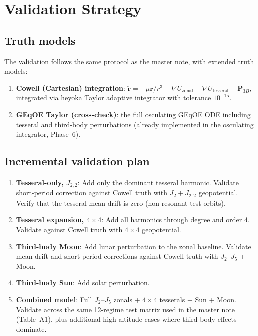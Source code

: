 \documentclass[11pt]{article}
\begin{document}
\section{Validation Strategy}
\label{sec:validation}

\subsection{Truth models}

The validation follows the same protocol as the master note, with extended
truth models:

\begin{enumerate}
\item \textbf{Cowell (Cartesian) integration}: $\ddot{\bm r} =
-\mu\bm r/r^3 - \nabla U_{\text{zonal}} - \nabla U_{\text{tesseral}}
+ \bm P_{3B}$, integrated via heyoka Taylor adaptive integrator with
tolerance $10^{-15}$.

\item \textbf{GEqOE Taylor (cross-check)}: the full osculating GEqOE ODE
including tesseral and third-body perturbations (already implemented in the
osculating integrator, Phase~6).
\end{enumerate}

\subsection{Incremental validation plan}

\begin{enumerate}
\item \textbf{Tesseral-only, $J_{2,2}$}: Add only the dominant tesseral
harmonic. Validate short-period correction against Cowell truth with
$J_2 + J_{2,2}$ geopotential. Verify that the tesseral mean drift is
zero (non-resonant test orbits).

\item \textbf{Tesseral expansion, $4 \times 4$}: Add all harmonics
through degree and order 4. Validate against Cowell truth with $4 \times 4$
geopotential.

\item \textbf{Third-body Moon}: Add lunar perturbation to the zonal
baseline. Validate mean drift and short-period corrections against Cowell
truth with $J_2$--$J_5$ + Moon.

\item \textbf{Third-body Sun}: Add solar perturbation.

\item \textbf{Combined model}: Full $J_2$--$J_5$ zonals + $4 \times 4$
tesserals + Sun + Moon. Validate across the same 12-regime test matrix
used in the master note (Table~A1), plus additional high-altitude cases
where third-body effects dominate.
\end{enumerate}
\end{document}
